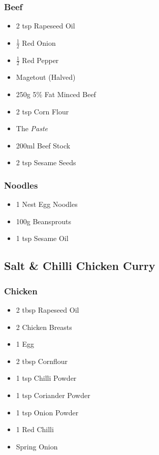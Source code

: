 \documentclass[11pt, english]{article}
\begin{document}
		\subsubsection*{Beef}

	\begin{itemize}
        \setlength\itemsep{0cm}
                \item 2 tsp Rapeseed Oil
		\item $\frac{1}{2}$ Red Onion
		\item $\frac{1}{2}$ Red Pepper
		\item Magetout (Halved)
		\item 250g 5\% Fat Minced Beef
		\item 2 tsp Corn Flour
		\item The \textit{Paste}
		\item 200ml Beef Stock
		\item 2 tsp Sesame Seeds
        \end{itemize}

		\subsubsection*{Noodles}

	\begin{itemize}
        \setlength\itemsep{0cm}
                \item 1 Nest Egg Noodles
		\item 100g Beansprouts
		\item 1 tsp Sesame Oil
        \end{itemize}

\newpage

	\subsection{Salt \& Chilli Chicken Curry}

		\subsubsection*{Chicken}

	\begin{itemize}
        \setlength\itemsep{0cm}
                \item 2 tbsp Rapeseed Oil
		\item 2 Chicken Breasts
		\item 1 Egg
		\item 2 tbsp Cornflour
		\item 1 tsp Chilli Powder
		\item 1 tsp Coriander Powder
		\item 1 tsp Onion Powder
		\item 1 Red Chilli
		\item Spring Onion
        \end{itemize}
\end{document}
